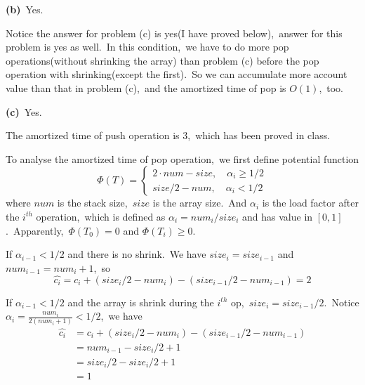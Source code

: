 \documentclass[]{article}
\begin{document}
    \textbf{(b)}\ Yes.
    
    Notice the answer for problem (c) is yes(I have proved below),\ answer for this problem is yes as well.\ In this condition,\ we have to do more pop operations(without shrinking the array) than problem (c) before the pop operation with shrinking(except the first).\ So we can accumulate more account value than that in problem (c),\ and the amortized time of pop is $O(1)$,\ too.
       
    \textbf{(c)}\ Yes.
    
    The amortized time of push operation is $3$,\ which has been proved in class.
    
    To analyse the amortized time of pop operation,\ we first define potential function
    \begin{equation*}
    \Phi(T) = \begin{cases}
    2\cdot num - size,\quad \alpha_i\geq 1/2 \\
    size/2 - num,\quad \alpha_i< 1/2
    \end{cases}
    \end{equation*}  
    where $num$ is the stack size,\ $size$ is the array size.\ And $\alpha_i$ is the load factor after the $i^{th}$ operation,\ which is defined as $\alpha_i = num_i/size_i$ and has value in $[0,1]$.\ Apparently,\ $\Phi(T_0) = 0$ and $\Phi(T_i)\geq 0$.
    
    If $\alpha_{i-1}< 1/2$ and there is no shrink.\ We have $size_i = size_{i-1}$ and $num_{i-1} = num_i + 1$,\ so
    \begin{equation*}
    \hat{c_i} = c_i + (size_i/2 - num_i) - (size_{i-1}/2 - num_{i-1}) = 2
    \end{equation*}
    
    If $\alpha_{i-1}< 1/2$ and the array is shrink during the $i^{th}$ op,\ $size_i = size_{i-1}/2$.\ Notice $\alpha_i = \frac{num_i}{2(num_i + 1)} < 1/2$,\ we have
    \begin{equation*}
    \begin{aligned}
    \hat{c_i} &= c_i + (size_i/2 - num_i) - (size_{i-1}/2 - num_{i-1})\\
    &= num_{i-1} - size_i/2 + 1\\
    &= size_i/2 - size_i/2 +1\\
    &= 1
    \end{aligned}
    \end{equation*}
    
\end{document}

